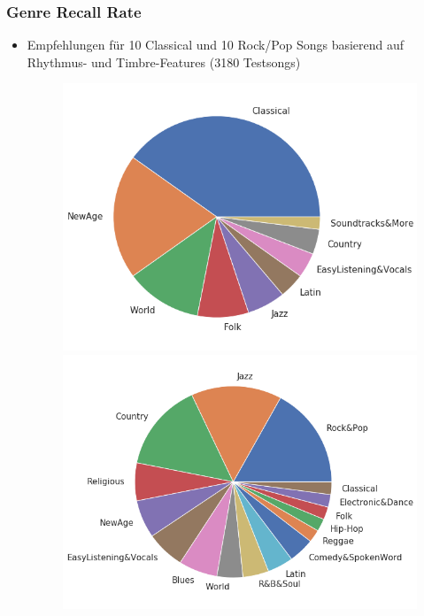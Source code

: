 \documentclass[12pt]{FSUBeamer_official}
\begin{document}
\begin{frame}
	\frametitle{Genre Recall Rate}
	\begin{itemize}
		\item Empfehlungen für 10 Classical und 10 Rock/Pop Songs basierend auf Rhythmus- und Timbre-Features (3180 Testsongs)
		\begin{figure}[ht]
			\begin{minipage}[b]{0.47\linewidth}
				\centering
				\includegraphics[width=\textwidth]{pics/SparkFeat/1517clasall.png}
			\end{minipage}
			\hspace{0.5cm}
			\begin{minipage}[b]{0.47\linewidth}
				\centering
				\includegraphics[width=\textwidth]{pics/SparkFeat/1517rockall.png}
			\end{minipage}
		\end{figure}
	\end{itemize}
\end{frame}
\end{document}
